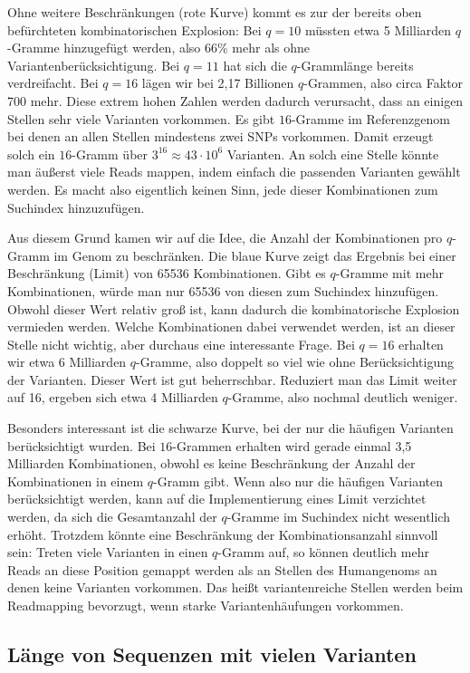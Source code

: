 Ohne weitere Beschränkungen (rote Kurve) kommt es zur der bereits oben befürchteten kombinatorischen Explosion: Bei $q=10$ müssten etwa 5 Milliarden $q$-Gramme hinzugefügt werden, also 66\% mehr als ohne Variantenberücksichtigung. Bei $q=11$ hat sich die $q$-Grammlänge bereits verdreifacht. Bei $q=16$ lägen wir bei 2,17 Billionen $q$-Grammen, also circa Faktor 700 mehr. Diese extrem hohen Zahlen werden dadurch verursacht, dass an einigen Stellen sehr viele Varianten vorkommen. Es gibt $16$-Gramme im Referenzgenom bei denen an allen Stellen mindestens zwei SNPs vorkommen. Damit erzeugt solch ein $16$-Gramm über $3^{16} \approx 43 \cdot 10^6$ Varianten. An solch eine Stelle könnte man äußerst viele Reads mappen, indem einfach die passenden Varianten gewählt werden. Es macht also eigentlich keinen Sinn, jede dieser Kombinationen zum Suchindex hinzuzufügen.

Aus diesem Grund kamen wir auf die Idee, die Anzahl der Kombinationen pro $q$-Gramm im Genom zu beschränken. Die blaue Kurve zeigt das Ergebnis bei einer Beschränkung (Limit) von 65536 Kombinationen. Gibt es $q$-Gramme mit mehr Kombinationen, würde man nur 65536 von diesen zum Suchindex hinzufügen. Obwohl dieser Wert relativ groß ist, kann dadurch die kombinatorische Explosion vermieden werden. Welche Kombinationen dabei verwendet werden, ist an dieser Stelle nicht wichtig, aber durchaus eine interessante Frage. Bei $q=16$ erhalten wir etwa 6 Milliarden $q$-Gramme, also doppelt so viel wie ohne Berücksichtigung der Varianten. Dieser Wert ist gut beherrschbar. Reduziert man das Limit weiter auf 16, ergeben sich etwa 4 Milliarden $q$-Gramme, also nochmal deutlich weniger.

Besonders interessant ist die schwarze Kurve, bei der nur die häufigen Varianten berücksichtigt wurden. Bei $16$-Grammen erhalten wird gerade einmal 3,5 Milliarden Kombinationen, obwohl es keine Beschränkung der Anzahl der Kombinationen in einem $q$-Gramm gibt. 
Wenn also nur die häufigen Varianten berücksichtigt werden, kann auf die Implementierung eines Limit verzichtet werden, da sich die Gesamtanzahl der $q$-Gramme im Suchindex nicht wesentlich erhöht. Trotzdem könnte eine Beschränkung der Kombinationsanzahl sinnvoll sein: Treten viele Varianten in einen $q$-Gramm auf, so können deutlich mehr Reads an diese Position gemappt werden als an Stellen des Humangenoms an denen keine Varianten vorkommen. Das heißt variantenreiche Stellen werden beim Readmapping bevorzugt, wenn starke Variantenhäufungen vorkommen.

\subsection{Länge von Sequenzen mit vielen Varianten}
\label{sec:stats:res:nogapseq}

